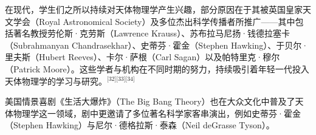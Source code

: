 在现代，学生们之所以持续对天体物理学产生兴趣，部分原因在于其被英国皇家天文学会（Royal Astronomical Society）及多位杰出科学传播者所推广——其中包括著名教授劳伦斯·克劳斯（Lawrence Krauss）、苏布拉马尼扬·钱德拉塞卡（Subrahmanyan Chandrasekhar）、史蒂芬·霍金（Stephen Hawking）、于贝尔·里夫斯（Hubert Reeves）、卡尔·萨根（Carl Sagan）以及帕特里克·穆尔（Patrick Moore）。这些学者与机构在不同时期的努力，持续吸引着年轻一代投入天体物理学的学习与研究。\(^\text{[32][33][34]}\)

美国情景喜剧《生活大爆炸》（The Big Bang Theory）也在大众文化中普及了天体物理学这一领域，剧中更邀请了多位著名科学家客串演出，例如史蒂芬·霍金（Stephen Hawking）与尼尔·德格拉斯·泰森（Neil deGrasse Tyson）。
